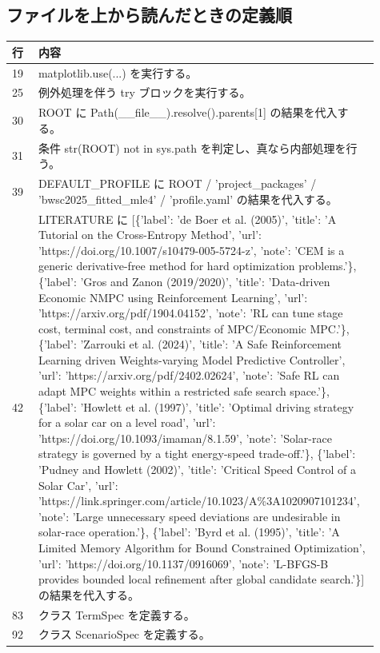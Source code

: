 \documentclass[a4paper,11pt]{article}
\begin{document}
        \subsection{ファイルを上から読んだときの定義順}
            \begin{longtable}{p{0.07\linewidth} p{0.84\linewidth}}
            \toprule
            行 & 内容 \\
            \midrule
            19 & matplotlib.use(...) を実行する。 \\
25 & 例外処理を伴う try ブロックを実行する。 \\
30 & ROOT に Path(\_\_file\_\_).resolve().parents[1] の結果を代入する。 \\
31 & 条件 str(ROOT) not in sys.path を判定し、真なら内部処理を行う。 \\
39 & DEFAULT\_PROFILE に ROOT / 'project\_packages' / 'bwsc2025\_fitted\_mle4' / 'profile.yaml' の結果を代入する。 \\
42 & LITERATURE に [\{'label': 'de Boer et al. (2005)', 'title': 'A Tutorial on the Cross-Entropy Method', 'url': 'https://doi.org/10.1007/s10479-005-5724-z', 'note': 'CEM is a generic derivative-free method for hard optimization problems.'\}, \{'label': 'Gros and Zanon (2019/2020)', 'title': 'Data-driven Economic NMPC using Reinforcement Learning', 'url': 'https://arxiv.org/pdf/1904.04152', 'note': 'RL can tune stage cost, terminal cost, and constraints of MPC/Economic MPC.'\}, \{'label': 'Zarrouki et al. (2024)', 'title': 'A Safe Reinforcement Learning driven Weights-varying Model Predictive Controller', 'url': 'https://arxiv.org/pdf/2402.02624', 'note': 'Safe RL can adapt MPC weights within a restricted safe search space.'\}, \{'label': 'Howlett et al. (1997)', 'title': 'Optimal driving strategy for a solar car on a level road', 'url': 'https://doi.org/10.1093/imaman/8.1.59', 'note': 'Solar-race strategy is governed by a tight energy-speed trade-off.'\}, \{'label': 'Pudney and Howlett (2002)', 'title': 'Critical Speed Control of a Solar Car', 'url': 'https://link.springer.com/article/10.1023/A\%3A1020907101234', 'note': 'Large unnecessary speed deviations are undesirable in solar-race operation.'\}, \{'label': 'Byrd et al. (1995)', 'title': 'A Limited Memory Algorithm for Bound Constrained Optimization', 'url': 'https://doi.org/10.1137/0916069', 'note': 'L-BFGS-B provides bounded local refinement after global candidate search.'\}] の結果を代入する。 \\
83 & クラス TermSpec を定義する。 \\
92 & クラス ScenarioSpec を定義する。 \\

\end{longtable}
\end{document}
